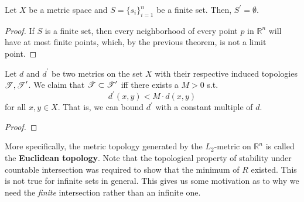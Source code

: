   \begin{corollary}
    Let $X$ be a metric space and $S = \{s_i\}_{i=1}^n$ be a finite set. Then, $S^\prime = \emptyset$.  
  \end{corollary}
  \begin{proof}
    If $S$ is a finite set, then every neighborhood of every point $p$ in $\mathbb{R}^n$ will have at most finite points, which, by the previous theorem, is not a limit point. 
  \end{proof}

  \begin{lemma}
    Let $d$ and $d^\prime$ be two metrics on the set $X$ with their respective induced topologies $\T, \T^\prime$. We claim that $\T \subset \T^\prime$ iff there exists a $M > 0$ s.t. 
    \begin{equation}
      d^\prime (x, y) < M \cdot d(x, y)
    \end{equation} 
    for all $x, y \in X$. That is, we can bound $d^\prime$ with a constant multiple of $d$. 
  \end{lemma}
  \begin{proof}
    
  \end{proof}

  More specifically, the metric topology generated by the $L_2$-metric on $\mathbb{R}^n$ is called the \textbf{Euclidean topology}. Note that the topological property of stability under countable intersection was required to show that the minimum of $R$ existed. This is not true for infinite sets in general. This gives us some motivation as to why we need the \textit{finite} intersection rather than an infinite one. 
  
